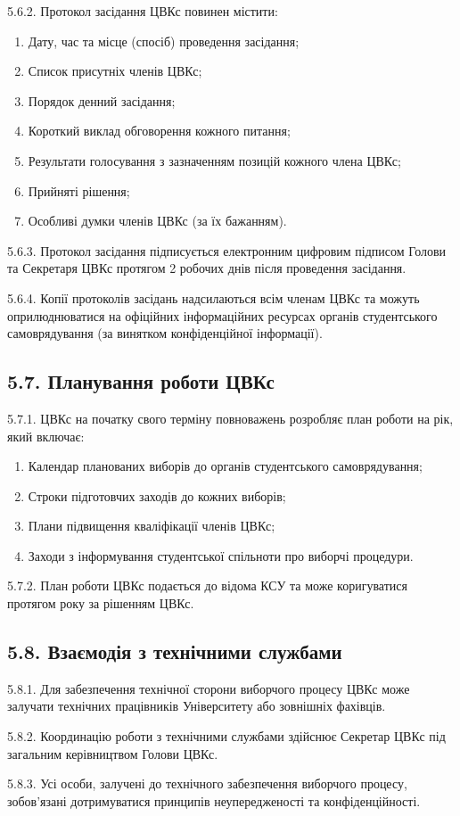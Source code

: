     5.6.2. Протокол засідання ЦВКс повинен містити:

        \begin{enumerate}[label=\alph*)]
            \item Дату, час та місце (спосіб) проведення засідання;
            \item Список присутніх членів ЦВКс;
            \item Порядок денний засідання;
            \item Короткий виклад обговорення кожного питання;
            \item Результати голосування з зазначенням позицій кожного члена ЦВКс;
            \item Прийняті рішення;
            \item Особливі думки членів ЦВКс (за їх бажанням).
        \end{enumerate}

    5.6.3. Протокол засідання підписується електронним цифровим підписом Голови та Секретаря ЦВКс протягом 2 робочих днів після проведення засідання.

    5.6.4. Копії протоколів засідань надсилаються всім членам ЦВКс та можуть оприлюднюватися на офіційних інформаційних ресурсах органів студентського самоврядування (за винятком конфіденційної інформації).

\subsection*{5.7. Планування роботи ЦВКс}
    5.7.1. ЦВКс на початку свого терміну повноважень розробляє план роботи на рік, який включає:

        \begin{enumerate}[label=\alph*)]
            \item Календар планованих виборів до органів студентського самоврядування;
            \item Строки підготовчих заходів до кожних виборів;
            \item Плани підвищення кваліфікації членів ЦВКс;
            \item Заходи з інформування студентської спільноти про виборчі процедури.
        \end{enumerate}

    5.7.2. План роботи ЦВКс подається до відома КСУ та може коригуватися протягом року за рішенням ЦВКс.

\subsection*{5.8. Взаємодія з технічними службами}
    5.8.1. Для забезпечення технічної сторони виборчого процесу ЦВКс може залучати технічних працівників Університету або зовнішніх фахівців.

    5.8.2. Координацію роботи з технічними службами здійснює Секретар ЦВКс під загальним керівництвом Голови ЦВКс.

    5.8.3. Усі особи, залучені до технічного забезпечення виборчого процесу, зобов'язані дотримуватися принципів неупередженості та конфіденційності.